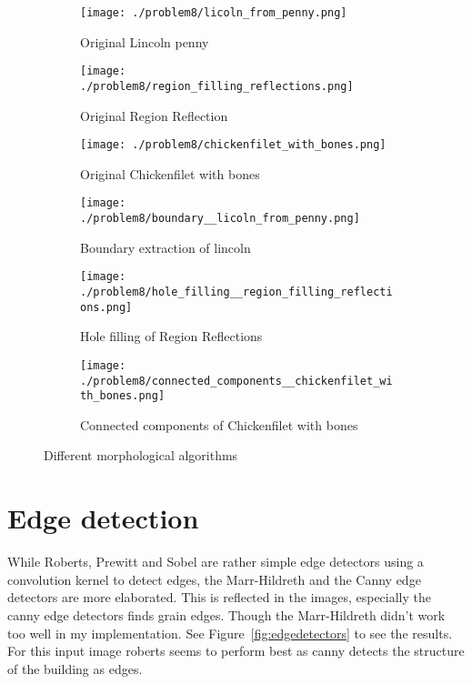 \documentclass[a4paper]{scrartcl}
\begin{document}
\begin{figure}[H]
  \centering
  \begin{subfigure}[t]{0.3\textwidth}
    \texttt{[image: ./problem8/licoln\_from\_penny.png]}
    \caption{Original Lincoln penny}
  \end{subfigure}
  \begin{subfigure}[t]{0.3\textwidth}
    \texttt{[image: ./problem8/region\_filling\_reflections.png]}
    \caption{Original Region Reflection}
  \end{subfigure}
  \begin{subfigure}[t]{0.3\textwidth}
    \texttt{[image: ./problem8/chickenfilet\_with\_bones.png]}
    \caption{Original Chickenfilet with bones}
  \end{subfigure}
  \begin{subfigure}[t]{0.3\textwidth}
    \texttt{[image: ./problem8/boundary\_\_licoln\_from\_penny.png]}
    \caption{Boundary extraction of lincoln}
  \end{subfigure}
  \begin{subfigure}[t]{0.3\textwidth}
    \texttt{[image: ./problem8/hole\_filling\_\_region\_filling\_reflections.png]}
    \caption{Hole filling of Region Reflections}
  \end{subfigure}
  \begin{subfigure}[t]{0.3\textwidth}
    \texttt{[image: ./problem8/connected\_components\_\_chickenfilet\_with\_bones.png]}
    \caption{Connected components of Chickenfilet with bones}
  \end{subfigure}
  \caption{Different morphological algorithms}
  \label{fig:morphologicalalgs}
\end{figure}

\section{Edge detection}

While Roberts, Prewitt and Sobel are rather simple edge detectors using a convolution kernel to detect edges, the Marr-Hildreth and the Canny edge detectors are more elaborated. This is reflected in the images, especially the canny edge detectors finds grain edges. Though the Marr-Hildreth didn't work too well in my implementation. See Figure~\ref{fig:edgedetectors} to see the results. For this input image roberts seems to perform best as canny detects the structure of the building as edges.
\end{document}
